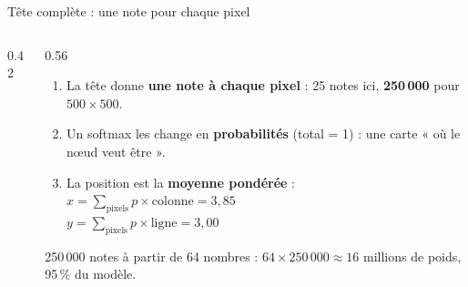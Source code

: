 \documentclass[aspectratio=169,11pt]{beamer}
\newcommand{\cellules}{2/2/0.05, 3/2/0.10, 4/2/0.05, 1/3/0.05, 2/3/0.15, 3/3/0.30, 4/3/0.10, 2/4/0.05, 3/4/0.10, 4/4/0.05}
\newcommand{\grille}{%
  \foreach \i in {0,...,4} \foreach \j in {0,...,4} \draw[trait,fill=white] (\i*0.75,-\j*0.75) rectangle ++(0.75,-0.75);}
\newcommand{\carte}{%
  \foreach \c/\l/\p in \cellules {
    \pgfmathsetmacro{\op}{\p/0.30}
    \fill[orange,fill opacity=\op] (\c*0.75,-\l*0.75+0.75) rectangle ++(0.75,-0.75);
    \node[font=\tiny] at (\c*0.75+0.375,-\l*0.75+0.375) {\p};}}
\begin{document}
\begin{frame}{Tête complète : une note pour chaque pixel}
\begin{columns}[c]
\begin{column}{0.42\textwidth}
\centering
{}
\end{column}
\begin{column}{0.56\textwidth}
\small
\begin{enumerate}
\setlength{\itemsep}{6pt}
\item La tête donne \textbf{une note à chaque pixel} : 25 notes ici, \textbf{250\,000} pour $500 \times 500$.
\item Un softmax les change en \textbf{probabilités} (total = 1) : une carte « où le nœud veut être ».
\item La position est la \textbf{moyenne pondérée} :\\[3pt]
$x = \sum_{\text{pixels}} p \times \text{colonne} = 3{,}85$\\[2pt]
$y = \sum_{\text{pixels}} p \times \text{ligne} = 3{,}00$
\end{enumerate}

\vspace{0.2cm}
\scriptsize\textcolor{gris}{250\,000 notes à partir de 64 nombres : $64 \times 250\,000 \approx 16$ millions de poids, 95\,\% du modèle.}
\end{column}
\end{columns}
\end{frame}
\end{document}

